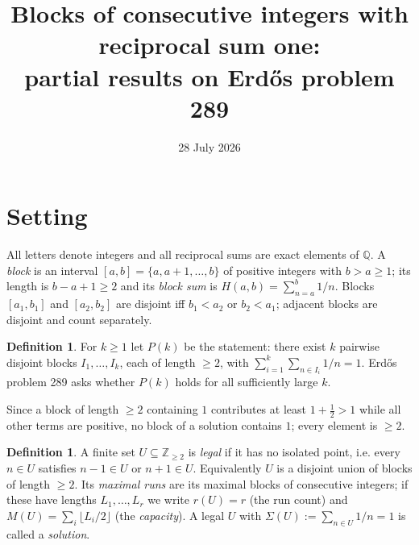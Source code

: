 \documentclass[11pt]{article}
\title{Blocks of consecutive integers with reciprocal sum one:\\
partial results on Erd\H{o}s problem 289}
\author{}
\date{28 July 2026}
\theoremstyle{definition}
\newtheorem{definition}[theorem]{Definition}
\begin{document}
\maketitle

\begin{center}
\end{center}

\section{Setting}

All letters denote integers and all reciprocal sums are exact elements of $\mathbb{Q}$.
A \emph{block} is an interval $[a,b]=\{a,a+1,\dots,b\}$ of positive integers with
$b>a\ge 1$; its length is $b-a+1\ge 2$ and its \emph{block sum} is
$H(a,b)=\sum_{n=a}^{b}1/n$. Blocks $[a_1,b_1]$ and $[a_2,b_2]$ are disjoint iff
$b_1<a_2$ or $b_2<a_1$; adjacent blocks are disjoint and count separately.

\begin{definition}
For $k\ge1$ let $P(k)$ be the statement: there exist $k$ pairwise disjoint blocks
$I_1,\dots,I_k$, each of length $\ge2$, with $\sum_{i=1}^{k}\sum_{n\in I_i}1/n=1$.
Erd\H{o}s problem 289 asks whether $P(k)$ holds for all sufficiently large $k$.
\end{definition}

Since a block of length $\ge2$ containing $1$ contributes at least $1+\tfrac12>1$ while all
other terms are positive, no block of a solution contains $1$; every element is $\ge2$.

\begin{definition}
A finite set $U\subseteq\mathbb{Z}_{\ge2}$ is \emph{legal} if it has no isolated point, i.e.
every $n\in U$ satisfies $n-1\in U$ or $n+1\in U$. Equivalently $U$ is a disjoint union of
blocks of length $\ge2$. Its \emph{maximal runs} are its maximal blocks of consecutive
integers; if these have lengths $L_1,\dots,L_r$ we write $r(U)=r$ (the run count) and
$M(U)=\sum_{i}\lfloor L_i/2\rfloor$ (the \emph{capacity}). A legal $U$ with
$\Sigma(U):=\sum_{n\in U}1/n=1$ is called a \emph{solution}.
\end{definition}
\end{document}
